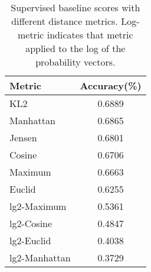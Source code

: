 \begin{table}[ht] \centering
\begin{tabular}{|l|c|}
\hline
Metric & Accuracy(\%) \\
\hline
KL2 & 0.6889 \\
Manhattan & 0.6865 \\
Jensen & 0.6801 \\
Cosine & 0.6706 \\
Maximum & 0.6663 \\
Euclid & 0.6255 \\
lg2-Maximum & 0.5361 \\
lg2-Cosine & 0.4847 \\
lg2-Euclid & 0.4038 \\
lg2-Manhattan & 0.3729 \\
\hline
\end{tabular}
\caption{Supervised baseline scores with different distance metrics.
  Log-metric indicates that metric applied to the log of the
  probability vectors.}
\label{tab:distscores}
\end{table}




